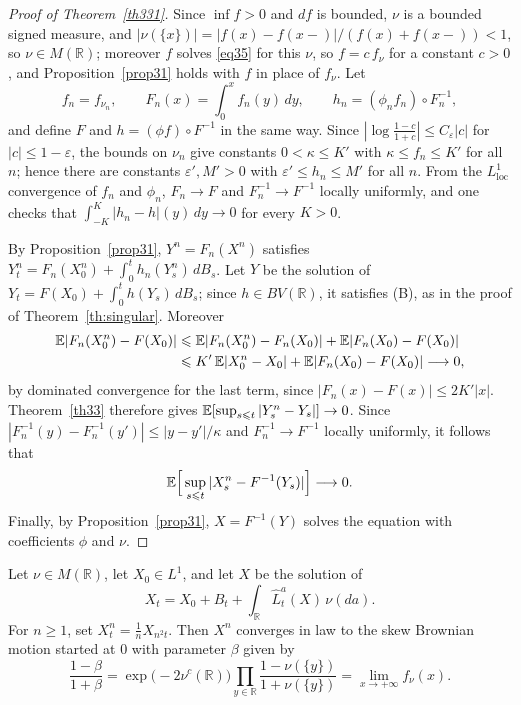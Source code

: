 \begin{proof}[Proof of Theorem~\ref{th331}]
	Since $\inf f > 0$ and $df$ is bounded, $\nu$ is a bounded signed measure, and
	$|\nu(\{x\})| = |f(x)-f(x-)|/(f(x)+f(x-)) < 1$, so $\nu\in M(\mathbb{R})$; moreover $f$
	solves \eqref{eq35} for this $\nu$, so $f = c\,f_\nu$ for a constant $c > 0$, and
	Proposition~\ref{prop31} holds with $f$ in place of $f_\nu$. Let
	\[
		f_n=f_{\nu_n}, \qquad F_n(x) =\int_0^x f_n(y)\,dy, \qquad h_n =(\phi_n f_n) \circ F_n^{-1},
	\]
	and define $F$ and $h = (\phi f)\circ F^{-1}$ in the same way. Since
	$|\log\frac{1-c}{1+c}| \leqslant C_\varepsilon |c|$ for $|c|\leqslant 1-\varepsilon$, the
	bounds on $\nu_n$ give constants $0<\kappa\leqslant K'$ with
	$\kappa \leqslant f_n\leqslant K'$ for all $n$; hence there are constants
	$\varepsilon', M'>0$ with $\varepsilon'\leqslant h_n\leqslant M'$ for all $n$. From the
	$L^1_{\mathrm{loc}}$ convergence of $f_n$ and $\phi_n$, $F_n\to F$ and
	$F_n^{-1}\to F^{-1}$ locally uniformly, and one checks that
	$\int_{-K}^K |h_n - h| (y)\,dy \to 0$ for every $K > 0$.

	By Proposition~\ref{prop31}, $Y^n = F_n(X^n)$ satisfies
	$Y_t^n= F_n(X^n_0) + \int_0^t h_n(Y_s^n)\,dB_s$. Let $Y$ be the solution of
	$Y_t= F(X_0)+\int_0^t h(Y_s)\,dB_s$; since $h\in BV(\mathbb{R})$, it satisfies (B),
	as in the proof of Theorem~\ref{th:singular}. Moreover
	\begin{align*}
		\mathbb{E}|F_n(X^n_0) - F(X_0)| & \leqslant \mathbb{E}|F_n(X_0^n) -F_n(X_0)| + \mathbb{E}|F_n(X_0) -F(X_0)|          \\
		                        & \leqslant K'\,\mathbb{E}|X^n_0 - X_0| + \mathbb{E}|F_n(X_0) -F(X_0)| \longrightarrow 0,
	\end{align*}
	by dominated convergence for the last term, since $|F_n(x)-F(x)|\leqslant 2K'|x|$.
	Theorem~\ref{th33} therefore gives
	$\mathbb{E}[\sup_{s\leqslant t} |Y_s^n - Y_s|] \to 0$. Since
	$|F_n^{-1}(y) - F_n^{-1}(y')|\leqslant |y-y'|/\kappa$ and $F_n^{-1}\to F^{-1}$ locally
	uniformly, it follows that
	\[
		\mathbb{E}\Big[\sup_{s\leqslant t} |X_s^n - F^{-1}(Y_s)| \Big]\longrightarrow 0 .
	\]
	Finally, by Proposition~\ref{prop31}, $X = F^{-1}(Y)$ solves the equation with
	coefficients $\phi$ and $\nu$.
\end{proof}

\begin{corollary}\label{cor331}
	Let $\nu\in M(\mathbb{R})$, let $X_0\in L^1$, and let $X$ be the solution of
	\[
		X_t=X_0 + B_t+\int_\mathbb{R} \hat{L}_t^a(X)\,\nu(da) .
	\]
	For $n \geqslant 1$, set $X_t^n =\frac{1}{n}X_{n^2 t}$. Then $X^n$ converges in law
	to the skew Brownian motion started at $0$ with parameter $\beta$ given by
	\[
		\frac{1-\beta}{1+\beta}=\exp\big(-2 \nu^c(\mathbb{R})\big)\prod_{y\in\mathbb{R}}
		\frac{1-\nu (\{ y\})}{1+\nu (\{ y\} )} = \lim_{x\to+\infty} f_\nu(x) .
	\]
\end{corollary}

